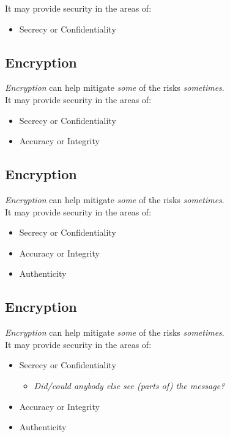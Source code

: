 \documentclass[xga]{xdvislides}
\begin{document}
It may provide security in the areas of:
\begin{itemize}
	\item Secrecy or Confidentiality
\end{itemize}

\subsection{Encryption}
{\em Encryption} can help mitigate {\em some} of the risks {\em sometimes}.
\\

It may provide security in the areas of:
\begin{itemize}
	\item Secrecy or Confidentiality
	\item Accuracy or Integrity
\end{itemize}

\subsection{Encryption}
{\em Encryption} can help mitigate {\em some} of the risks {\em sometimes}.
\\

It may provide security in the areas of:
\begin{itemize}
	\item Secrecy or Confidentiality
	\item Accuracy or Integrity
	\item Authenticity
\end{itemize}

\subsection{Encryption}
{\em Encryption} can help mitigate {\em some} of the risks {\em sometimes}.
\\

It may provide security in the areas of:
\begin{itemize}
	\item Secrecy or Confidentiality
		\begin{itemize}
			\item {\em Did/could anybody else see (parts of) the message?}
		\end{itemize}
	\item Accuracy or Integrity
	\item Authenticity
\end{itemize}
\end{document}
